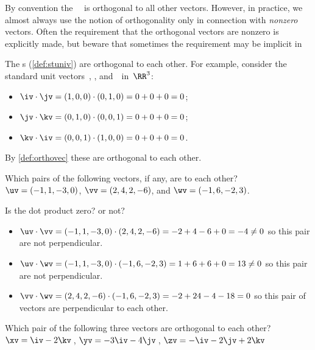 By convention the ~\ov\ is orthogonal to all other vectors.
However, in practice, we almost always use the notion of orthogonality only in connection with \emph{nonzero} vectors.
Often the requirement that the orthogonal vectors are nonzero is explicitly made, but beware that sometimes the requirement may be implicit in 


\begin{example} 
The s (\cref{def:stuniv}) are orthogonal to each other.
For example, consider the standard unit vectors~\iv, \jv, and~\kv\ in~\(\RR^3\):
%
\begin{itemize}
\item \(\iv\cdot\jv=(1,0,0)\cdot(0,1,0)=0+0+0=0\);
\item \(\jv\cdot\kv=(0,1,0)\cdot(0,0,1)=0+0+0=0\);
\item \(\kv\cdot\iv=(0,0,1)\cdot(1,0,0)=0+0+0=0\).
\end{itemize}
By \cref{def:orthovec} these are orthogonal to each other.
\end{example}


\begin{example} 
Which pairs of the following vectors, if any, are  to each other?
\(\uv=(-1,1,-3,0)\), \(\vv=(2,4,2,-6)\), and \(\wv=(-1,6,-2,3)\).
\begin{solution} 
Is the dot product zero? or not?
\begin{itemize}
\item \(\uv\cdot\vv =(-1,1,-3,0)\cdot(2,4,2,-6) =-2+4-6+0 =-4 \neq0\) so this pair are not perpendicular. 
\item \(\uv\cdot\wv =(-1,1,-3,0)\cdot(-1,6,-2,3) =1+6+6+0 =13 \neq0\) so this pair are not perpendicular. 
\item \(\vv\cdot\wv =(2,4,2,-6)\cdot(-1,6,-2,3) =-2+24-4-18 =0\) so this pair of vectors are perpendicular to each other. 
\aqed

\end{itemize}
\end{solution}
\end{example}


\begin{activity}
Which pair of the following three vectors are orthogonal to each other?
\(\xv=\iv-2\kv\)\,, \(\yv=-3\iv-4\jv\)\,, \(\zv=-\iv-2\jv+2\kv\)
\end{activity}




